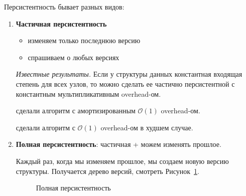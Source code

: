 Персистентность бывает разных видов:

\begin{enumerate}

\item {\bf Частичная персистентность}

\begin{itemize}

\item изменяем только последнюю версию
\item спрашиваем о любых версиях

\end{itemize}

\vspace{10pt}

{\it Известные результаты.} Если у структуры данных константная входящая степень для всех узлов, то можно сделать ее частично персистентной с константным мультипликативным overhead-ом.

\cite{driscoll1986making} сделали алгоритм с амортизированным $\mathcal{O}(1)$ overhead-ом.

\cite{brodal1996partially} сделали алгоритм с $\mathcal{O}(1)$ overhead-ом в худшем случае.

\item {\bf Полная персистентность}: частичная + можем изменять прошлое.

Каждый раз, когда мы изменяем прошлое, мы создаем новую версию структуры. Получается дерево версий, смотреть Рисунок~\ref{fig:TanyaTree}.

\begin{figure}[h] \centering
{}
	\caption{Полная персистентность}
	\label{fig:TanyaTree}
\end{figure}


\end{enumerate}
